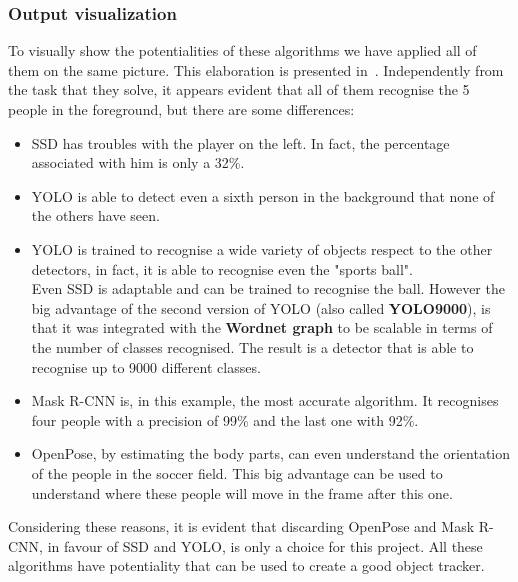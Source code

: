 \subsubsection*{Output visualization}
To visually show the potentialities of these algorithms we have applied all of them on the same picture. This elaboration is presented in~. Independently from the task that they solve, it appears evident that all of them recognise the 5 people in the foreground, but there are some differences:
\begin{itemize}
	\item SSD has troubles with the player on the left. In fact, the percentage associated with him is only a 32\%.
	\item YOLO is able to detect even a sixth person in the background that none of the others have seen.
	\item YOLO is trained to recognise a wide variety of objects respect to the other detectors, in fact, it is able to recognise even the "sports ball".\\
	Even SSD is adaptable and can be trained to recognise the ball. However the big advantage of the second version of YOLO (also called \textbf{YOLO9000}), is that it was integrated with the \textbf{Wordnet graph}\cite{wordnet} to be scalable in terms of the number of classes recognised. The result is a detector that is able to recognise up to 9000 different classes.
	\item Mask R-CNN is, in this example, the most accurate algorithm. It recognises four people with a precision of 99\% and the last one with 92\%. 
	\item OpenPose, by estimating the body parts, can even understand the orientation of the people in the soccer field. This big advantage can be used to understand where these people will move in the frame after this one.
\end{itemize}
Considering these reasons, it is evident that discarding OpenPose and Mask R-CNN, in favour of SSD and YOLO, is only a choice for this project. All these algorithms have potentiality that can be used to create a good object tracker.


